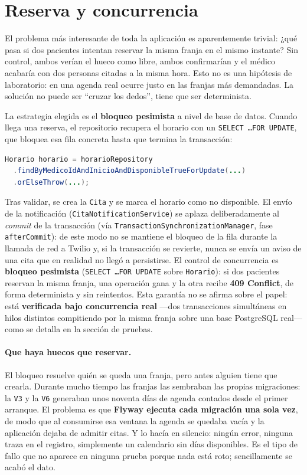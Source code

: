 \documentclass[12pt,a4paper]{report}
\begin{document}
\section{Reserva y concurrencia}

El problema más interesante de toda la aplicación es aparentemente trivial: ¿qué pasa si dos pacientes intentan reservar la misma franja en el mismo instante? Sin control, ambos verían el hueco como libre, ambos confirmarían y el médico acabaría con dos personas citadas a la misma hora. Esto no es una hipótesis de laboratorio: en una agenda real ocurre justo en las franjas más demandadas. La solución no puede ser ``cruzar los dedos'', tiene que ser determinista.

La estrategia elegida es el \textbf{bloqueo pesimista} a nivel de base de datos. Cuando llega una reserva, el repositorio recupera el horario con un \texttt{SELECT \ldots FOR UPDATE}, que bloquea esa fila concreta hasta que termina la transacción:

\begin{lstlisting}[language=Java]
Horario horario = horarioRepository
  .findByMedicoIdAndInicioAndDisponibleTrueForUpdate(...)
  .orElseThrow(...);
\end{lstlisting}

Tras validar, se crea la \texttt{Cita} y se marca el horario como no disponible. El envío de la notificación (\texttt{CitaNotificationService}) se aplaza deliberadamente al \emph{commit} de la transacción (vía \texttt{TransactionSynchronizationManager}, fase \texttt{afterCommit}): de este modo no se mantiene el bloqueo de la fila durante la llamada de red a Twilio y, si la transacción se revierte, nunca se envía un aviso de una cita que en realidad no llegó a persistirse. El control de concurrencia es \textbf{bloqueo pesimista} (\texttt{SELECT \ldots FOR UPDATE} sobre \texttt{Horario}): si dos pacientes reservan la misma franja, una operación gana y la otra recibe \textbf{409 Conflict}, de forma determinista y sin reintentos. Esta garantía no se afirma sobre el papel: está \textbf{verificada bajo concurrencia real} —dos transacciones simultáneas en hilos distintos compitiendo por la misma franja sobre una base PostgreSQL real— como se detalla en la sección de pruebas.

\paragraph{Que haya huecos que reservar.} El bloqueo resuelve quién se queda una franja, pero antes alguien tiene que crearla. Durante mucho tiempo las franjas las sembraban las propias migraciones: la \texttt{V3} y la \texttt{V6} generaban unos noventa días de agenda contados desde el primer arranque. El problema es que \textbf{Flyway ejecuta cada migración una sola vez}, de modo que al consumirse esa ventana la agenda se quedaba vacía y la aplicación dejaba de admitir citas. Y lo hacía en silencio: ningún error, ninguna traza en el registro, simplemente un calendario sin días disponibles. Es el tipo de fallo que no aparece en ninguna prueba porque nada está roto; sencillamente se acabó el dato.
\end{document}

